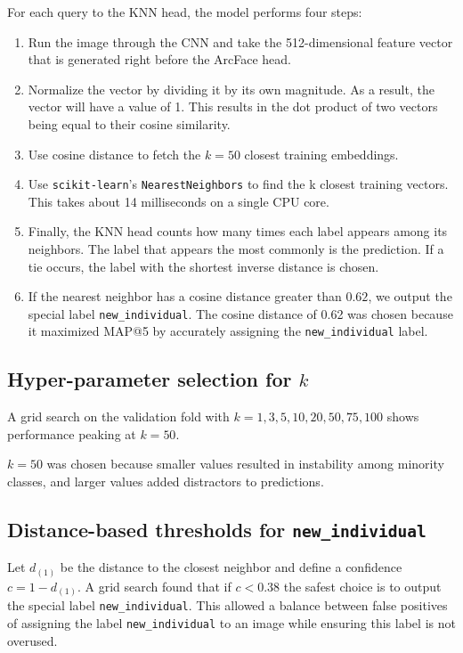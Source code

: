 \documentclass[twocolumn]{article}
\begin{document}
For each query to the KNN head, the model performs four steps:
\begin{enumerate}
    \item Run the image through the CNN and take the 512-dimensional feature vector that is generated right before the ArcFace head.
    \item Normalize the vector by dividing it by its own magnitude. As a result, the vector will have a value of 1. This results in the dot product of two vectors being equal to their cosine similarity.
    \item Use cosine distance to fetch the $k=50$ closest training embeddings.
    \item Use \texttt{scikit-learn}'s \texttt{NearestNeighbors} to find the k closest training vectors. This takes about 14 milliseconds on a single CPU core.
    \item Finally, the KNN head counts how many times each label appears among its neighbors.  The label that appears the most commonly is the prediction. If a tie occurs, the label with the shortest inverse distance is chosen.
    \item If the nearest neighbor has a cosine distance greater than $0.62$, we output the special label \texttt{new_individual}. The cosine distance of 0.62 was chosen because it maximized MAP@5 by accurately assigning the \texttt{new_individual} label.
\end{enumerate}

\subsection{Hyper-parameter selection for $k$}

A grid search on the validation fold with $k\!=\!1,3,5,10,20,50,75,100$ shows performance peaking at $k=50$. 

$k=50$ was chosen because smaller values resulted in instability among minority classes, and larger values added distractors to predictions.

\subsection{Distance-based thresholds for \texttt{new_individual}}

Let $d_{(1)}$ be the distance to the closest neighbor and define a confidence $c = 1 - d_{(1)}$.
A grid search found that if $c < 0.38$ the safest choice is to output the special label \texttt{new\_individual}.
This allowed a balance between false positives of assigning the label \texttt{new_individual} to an image while ensuring this label is not overused.
\end{document}

